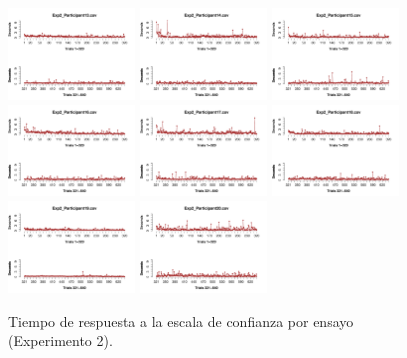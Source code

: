 \begin{figure}[th]
\includegraphics[width=0.30\textwidth]{Figures/RT2_Exp2_P13} \includegraphics[width=0.30\textwidth]{Figures/RT2_Exp2_P14} \includegraphics[width=0.30\textwidth]{Figures/RT2_Exp2_P15}
\includegraphics[width=0.30\textwidth]{Figures/RT2_Exp2_P16} \includegraphics[width=0.30\textwidth]{Figures/RT2_Exp2_P17} \includegraphics[width=0.30\textwidth]{Figures/RT2_Exp2_P18}
\includegraphics[width=0.30\textwidth]{Figures/RT2_Exp2_P19} \includegraphics[width=0.30\textwidth]{Figures/RT2_Exp2_P20} 
\caption[TR2_Exp2]{Tiempo de respuesta a la escala de confianza por ensayo (Experimento 2).}
\label{fig:RT2_E2}
\end{figure}
